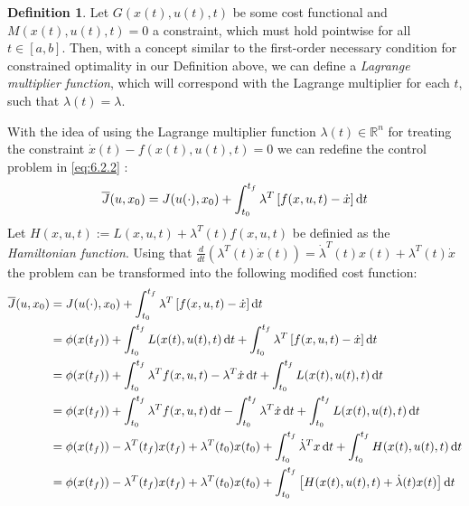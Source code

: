 \documentclass[paper=a4, pagesize, DIV=calc, BCOR=12.5mm, twoside=on, onecolumn=on, open = any, titlepage =on, parskip =half-, headsepline = on, footsepline = on, chapterprefix = on, appendixprefix = off, fontsize = 12pt, numbers = noenddot, abstract = on]{scrbook}
\numberwithin{equation}{chapter}
\theoremstyle{definition}
\newtheorem{definition}{Definition}
\theoremstyle{plain}
\theoremstyle{plain}
\theoremstyle{remark}
\theoremstyle{plain}
\theoremstyle{plain}
\begin{document}
\begin{definition}
Let $G(x(t), u(t), t)$ be some cost functional and $M(x(t), u(t), t) = 0$ a constraint, which must hold pointwise for all $t \in \left[a, b \right]$. Then, with a concept similar to the first-order necessary condition for constrained optimality in our Definition above, we can define a \emph{Lagrange multiplier function}, which will correspond with the Lagrange multiplier for each $t$, such that $ \lambda(t) = \lambda $. 
\end{definition}
\vspace*{-2.25cm}
With the idea of using the Lagrange multiplier function $\lambda (t) \in \mathbb{R}^n$ for treating the constraint $\dot{x}(t) - f(x(t), u(t), t) = 0$ we can redefine the control problem in \eqref{eq:6.2.2} \cite{lib:2012}:
\begin{equation}
\overline{J}(u, x_0)  =  J(u(\cdot), x_0) + \int_{t_0}^{t_f} \lambda^T \left[ f(x, u, t)-\dot{x} \right] \mathop{}\!\mathrm{d} t \label{eq:gocp}
\end{equation}
Let $H(x, u, t) := L(x,u,t) + \lambda^T(t)f(x, u, t) $ be definied as the \emph{Hamiltonian function}.  Using that $\frac{d}{dt}(\lambda^T(t)\dot{x}(t)) = \dot{\lambda}^T(t)x(t) + \lambda^T(t)\dot{x}$ the problem can be transformed into the following modified cost function:
\renewcommand\arraystretch{2}
\begin{align*}
\overline{J}(u, x_0) & =  J(u(\cdot), x_0) + \int_{t_0}^{t_f} \lambda^T \left[ f(x, u, t)-\dot{x} \right] \diff t\\
 & =  \phi(x(t_f)) + \int_{t_0}^{t_f} L(x(t), u(t), t) \diff t + \int_{t_0}^{t_f} \lambda^T \left[f(x, u, t)- \dot{x} \right] \diff t\\
  & =  \phi (x(t_f)) +  \int_{t_0}^{t_f} \lambda^T f(x, u, t) - \lambda^T \dot{x}  \diff t +  \int_{t_0}^{t_f} L(x(t), u(t), t) \diff t\\
   & =  \phi(x(t_f)) +  \int_{t_0}^{t_f} \lambda^T f(x, u, t) \diff t -  \int_{t_0}^{t_f}\lambda^T \dot{x} \diff t +  \int_{t_0}^{t_f} L(x(t), u(t), t) \diff t\\
    & =  \phi(x(t_f)) - \lambda^T (t_f )x(t_f) + \lambda^T(t_0) x(t_0) + \int_{t_0}^{t_f} \dot{\lambda}^T x \diff t + \int_{t_0}^{t_f} H(x(t), u(t), t) \diff t\\
     & =  \phi(x(t_f)) - \lambda^T (t_f) x(t_f) + \lambda^T(t_0) x(t_0) + \int_{t_0}^{t_f} \left[ H(x(t), u(t), t) + \dot{\lambda} (t)x(t) \right] \diff t
\end{align*}
\end{document}
